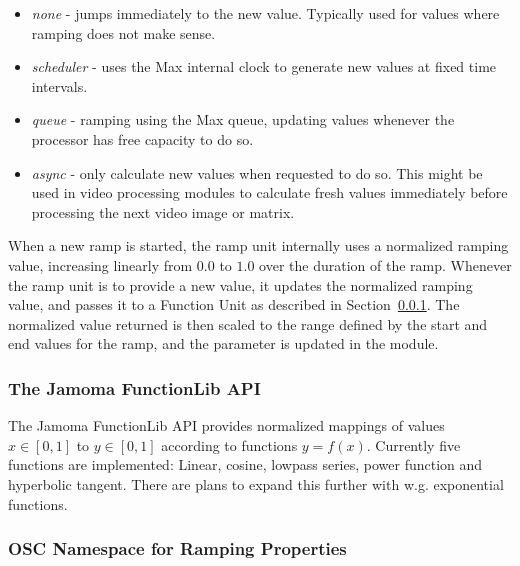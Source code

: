 \documentclass{NIME-alternate}
\begin{document}
\begin{itemize}

	\item \emph{none} - jumps immediately to the new value. Typically used for values where ramping does not make sense.

	\item \emph{scheduler} - uses the Max internal clock to generate new values at fixed time intervals.

	\item \emph{queue} - ramping using the Max queue, updating values whenever the processor has free capacity to do so.

	\item \emph{async} - only calculate new values when requested to do so. This might be used in video processing modules to calculate fresh values immediately before processing the next video image or matrix.
	
\end{itemize}

When a new ramp is started, the ramp unit internally uses a normalized ramping value, increasing linearly from $0.0$ to $1.0$ over the duration of the ramp. Whenever the ramp unit is to provide a new value, it updates the normalized ramping value, and passes it to a Function Unit as described in Section~\ref{ssub:the_function_lib}. The normalized value returned is then scaled to the range defined by the start and end values for the ramp, and the parameter is updated in the module.



\subsubsection{The Jamoma FunctionLib API} %
\label{ssub:the_function_lib}

The Jamoma FunctionLib API provides normalized mappings of values $x \in [0,1]$ to $y \in [0,1]$ according to functions $y = f(x)$. Currently five functions are implemented: Linear, cosine, lowpass series, power function and hyperbolic tangent. There are plans to expand this further with w.g. exponential functions.




\subsubsection{OSC Namespace for Ramping Properties} %
\label{ssub:osc_namespace_for_ramping_properties}
\end{document}
